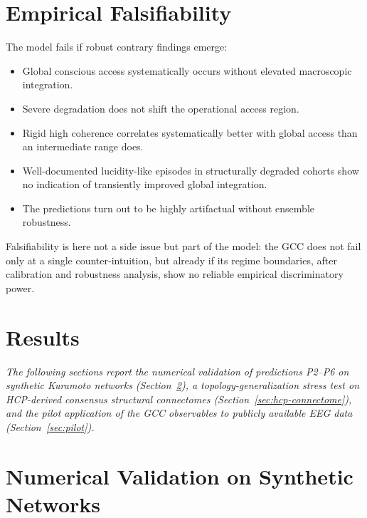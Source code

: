 \documentclass[11pt,a4paper]{article}
\theoremstyle{plain}
\theoremstyle{definition}
\theoremstyle{remark}
\begin{document}
\section{Empirical Falsifiability}
\label{sec:falsifizierbarkeit}

The model fails if robust contrary findings emerge:
\begin{itemize}
\item Global conscious access systematically occurs without elevated macroscopic integration.
\item Severe degradation does not shift the operational access region.
\item Rigid high coherence correlates systematically better with global access than an intermediate range does.
\item Well-documented lucidity-like episodes in structurally degraded cohorts show no indication of transiently improved global integration.
\item The predictions turn out to be highly artifactual without ensemble robustness.
\end{itemize}

Falsifiability is here not a side issue but part of the model: the GCC does not fail only at a single counter-intuition, but already if its regime boundaries, after calibration and robustness analysis, show no reliable empirical discriminatory power.


\section*{Results}

\noindent\textit{The following sections report the numerical validation of predictions P2--P6 on synthetic Kuramoto networks (Section~\ref{sec:numerics}), a topology-generalization stress test on HCP-derived consensus structural connectomes (Section~\ref{sec:hcp-connectome}), and the pilot application of the GCC observables to publicly available EEG data (Section~\ref{sec:pilot}).}

\section{Numerical Validation on Synthetic Networks}
\label{sec:numerics}
\end{document}
